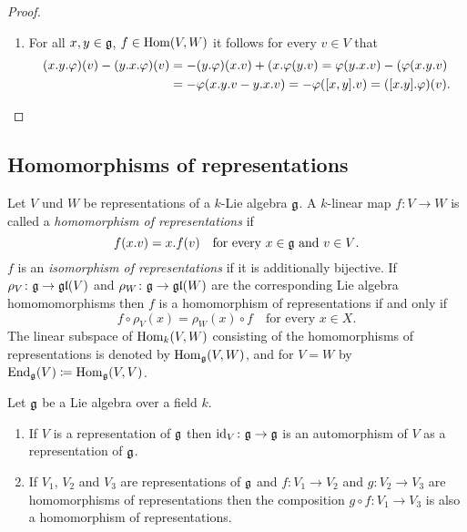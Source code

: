 \begin{proof}
\begin{enumerate}[leftmargin=*]
  \item
   For all $x,y \in \mathfrak{g}$, $f \in \operatorname{Hom}(V,W)$ it follows for every $v \in V$ that
   \begin{align*}
    (x.y.\varphi)(v) - (y.x.\varphi)(v)
    &= -(y.\varphi)(x.v) + (x.\varphi(y.v)
    = \varphi(y.x.v) - (\varphi(x.y.v) \\
    &= -\varphi(x.y.v - y.x.v)
    = -\varphi([x,y].v)
    = ([x.y].\varphi)(v).
   \qedhere
   \end{align*}
 \end{enumerate}
\end{proof}





\subsection{Homomorphisms of representations}


\begin{definition}
 Let $V$ und $W$ be representations of a $k$-Lie algebra $\mathfrak{g}$. A $k$-linear map $f \colon V \to W$ is called a \emph{homomorphism of representations} if
 \[
  f(x.v) = x.f(v) \quad \text{for every $x \in \mathfrak{g}$ and $v \in V$}.
 \]
 $f$ is an \emph{isomorphism of representations} if it is additionally bijective. If $\rho_V \colon \mathfrak{g} \to \mathfrak{gl}(V)$ and $\rho_W \colon \mathfrak{g} \to \mathfrak{gl}(W)$ are the corresponding Lie algebra homomomorphisms then $f$ is a homomorphism of representations if and only if
 \[
  f \circ \rho_V(x) = \rho_W(x) \circ f \quad \text{for every $x \in X$}.
 \]
 The linear subspace of $\operatorname{Hom}_k(V,W)$ consisting of the homomorphisms of representations is denoted by $\operatorname{Hom}_{\mathfrak{g}}(V,W)$, and for $V = W$ by $\operatorname{End}_{\mathfrak{g}}(V) \coloneqq \operatorname{Hom}_{\mathfrak{g}}(V,V)$. 
\end{definition}


\begin{examples}
 Let $\mathfrak{g}$ be a Lie algebra over a field $k$.
 \begin{enumerate}[leftmargin=*]
  \item
   If $V$ is a representation of $\mathfrak{g}$ then $\operatorname{id}_V \colon \mathfrak{g} \to \mathfrak{g}$ is an automorphism of $V$ as a representation of $\mathfrak{g}$.
  \item
   If $V_1$, $V_2$ and $V_3$ are representations of $\mathfrak{g}$ and $f \colon V_1 \to V_2$ and $g \colon V_2 \to V_3$ are homomorphisms of representations then the composition $g \circ f \colon V_1 \to V_3$ is also a homomorphism of representations.
 \end{enumerate}
\end{examples}


